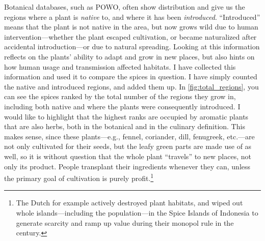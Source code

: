 Botanical databases, such as \gls{POWO}, often show distribution and  give us the regions where a plant is \textit{native} to, and where it has been \textit{introduced}. ``Introduced'' means that the plant is not native in the area, but now grows wild due to human intervention---whether the plant escaped cultivation, or became naturalized after accidental introduction---or due to natural spreading. Looking at this information reflects on the plants' ability to adapt and grow in new places, but also hints on how human usage and transmission affected habitats. I have collected this information and used it to compare the spices in question. I have simply counted the native and introduced regions, and added them up. In \cref{fig:total_regions}, you can see the spices ranked by the total number of the regions they grow in, including both native and where the plants were consequently introduced. I would like to highlight that the highest ranks are occupied by aromatic plants that are also herbs, both in the botanical and in the culinary definition. This makes sense, since these plants---e.g., fennel, coriander, dill, fenugreek, etc.---are not only cultivated for their seeds, but the leafy green parts are made use of as well, so it is without question that the whole plant ``travels'' to new places, not only its product. People transplant their ingredients whenever they can, unless the primary goal of cultivation is purely profit.\footnote{The Dutch for example actively destroyed plant habitats, and wiped out whole islands---including the population---in the Spice Islands of Indonesia to generate scarcity and ramp up value during their monopol rule in the  century.}

